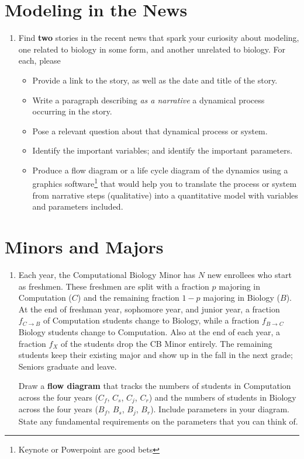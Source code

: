 \documentclass[11pt,onecolumn,superscriptaddress,notitlepage]{article}
\begin{document}
\section*{Modeling in the News}
\begin{enumerate}[resume]
\item Find {\bf two} stories in the recent news that spark your curiosity about modeling, one related to biology in some form, and another unrelated to biology. For each, please
\begin{itemize}
	\item Provide a link to the story, as well as the date and title of the story. 
	\item Write a paragraph describing {\it as a narrative} a dynamical process occurring in the story. 
	\item Pose a relevant question about that dynamical process or system.
	\item Identify the important variables; and identify the important parameters.
	\item Produce a flow diagram or a life cycle diagram of the dynamics using a graphics software\footnote{Keynote or Powerpoint are good bets} that would help you to translate the process or system from narrative steps (qualitative) into a quantitative model with variables and parameters included.
\end{itemize}
\end{enumerate}

\vspace{0.3in}
\section*{Minors and Majors}
\begin{enumerate}[resume]
\item Each year, the Computational Biology Minor has $N$ new enrollees who start as freshmen. These freshmen are split with a fraction $p$ majoring in Computation ($C$) and the remaining fraction $1-p$ majoring in Biology ($B$). At the end of freshman year, sophomore year, and junior year, a fraction $f_{C\to B}$ of Computation students change to Biology, while a fraction $f_{B\to C}$ Biology students change to Computation. Also at the end of each year, a fraction $f_X$ of the students drop the CB Minor entirely. The remaining students keep their existing major and show up in the fall in the next grade; Seniors graduate and leave.

Draw a {\bf flow diagram} that tracks the numbers of students in Computation across the four years ($C_f$, $C_s$, $C_j$, $C_r$) and the numbers of students in Biology across the four years ($B_f$, $B_s$, $B_j$, $B_r$). Include parameters in your diagram. State any fundamental requirements on the parameters that you can think of. 
\end{enumerate}
\end{document}
